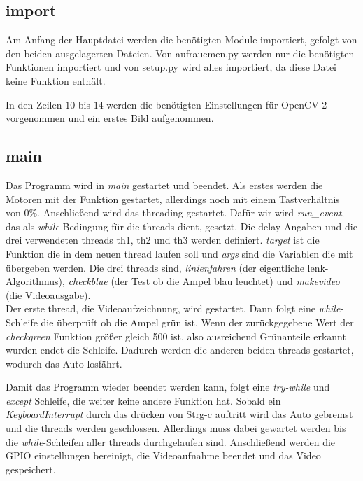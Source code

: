\documentclass[a4paper, 12pt]{scrartcl}
\begin{document}
\subsection{import}	%


Am Anfang der Hauptdatei werden die benötigten Module importiert, gefolgt von den beiden ausgelagerten Dateien. Von aufrauemen.py werden nur die benötigten Funktionen importiert und von setup.py wird alles importiert, da diese Datei keine Funktion enthält.

In den Zeilen $10$ bis $14$ werden die benötigten Einstellungen für OpenCV 2 vorgenommen und ein erstes Bild aufgenommen.

\subsection{main}	%


Das Programm wird in \textit{main} gestartet und beendet. Als erstes werden die Motoren mit der  Funktion gestartet, allerdings noch mit einem Tastverhältnis von 0\%.
Anschließend wird das threading gestartet. Dafür wir wird \textit{run\_event}, das als \textit{while}-Bedingung für die threads dient, gesetzt. Die delay-Angaben und die drei verwendeten threads th1, th2 und th3 werden definiert. \textit{target} ist die Funktion die in dem neuen thread laufen soll und \textit{args} sind die Variablen die mit übergeben werden.
Die drei threads sind, \textit{linienfahren} (der eigentliche lenk-Algorithmus), \textit{checkblue} (der Test ob die Ampel blau leuchtet) und \textit{makevideo} (die Videoausgabe).\\

Der erste thread, die Videoaufzeichnung, wird gestartet. Dann folgt eine \textit{while}-Schleife die überprüft ob die Ampel grün ist. Wenn der zurückgegebene Wert der \textit{checkgreen} Funktion größer gleich 500 ist, also ausreichend Grünanteile erkannt wurden endet die Schleife. Dadurch werden die anderen beiden threads gestartet, wodurch das Auto losfährt.

Damit das Programm wieder beendet werden kann, folgt eine \textit{try-while} und \textit{except} Schleife, die weiter keine andere Funktion hat. Sobald ein \textit{KeyboardInterrupt} durch das drücken von Strg-c auftritt wird das Auto gebremst und die threads werden geschlossen. Allerdings muss dabei gewartet werden bis die \textit{while}-Schleifen aller threads durchgelaufen sind. Anschließend werden die GPIO einstellungen bereinigt, die Videoaufnahme beendet und das Video gespeichert.\\
\end{document}
